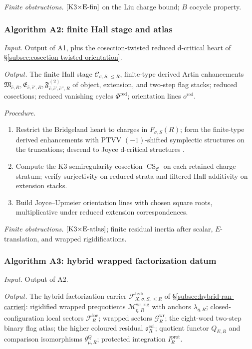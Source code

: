 \textit{Finite obstructions.}
$[\textup{K3$\times$E-fin}]$ on the Liu charge bound; $B$
cocycle property.

\subsubsection*{Algorithm A2: finite Hall stage and atlas}

\textit{Input.} Output of A1, plus the cosection-twisted reduced
d-critical heart of \S\ref{subsec:cosection-twisted-orientation}.

\textit{Output.} The finite Hall stage
$\mathcal C_{\sigma,S,\le R}$, finite-type derived Artin enhancements
$\mathfrak M_{\widehat c,R},
\mathfrak E_{\widehat c,\widehat c',R},
\mathfrak F^{(2)}_{\widehat c,\widehat c',\widehat c'',R}$ of object,
extension, and two-step flag stacks; reduced cosections; reduced
vanishing cycles $\Phi^{\mathrm{red}}$; orientation lines
$o^{\mathrm{red}}$.

\textit{Procedure.}
\begin{enumerate}
\item Restrict the Bridgeland heart to charges in $F_{\sigma,S}(R)$;
form the finite-type derived enhancements with PTVV $(-1)$-shifted
symplectic structures \cite{PTVV2013} on the truncations; descend to
Joyce d-critical structures \cite{BBDJS2015}.
\item Compute the K3 semiregularity cosection
$\operatorname{CS}_{\mathcal C}$ on each retained charge stratum;
verify surjectivity on reduced strata and filtered Hall additivity
on extension stacks.
\item Build Joyce--Upmeier orientation lines \cite{JoyceUpmeier} with
chosen square roots, multiplicative under reduced extension
correspondences.
\end{enumerate}

\textit{Finite obstructions.}
$[\textup{K3$\times$E-atlas}]$; finite residual inertia after
scalar, $E$-translation, and wrapped rigidifications.

\subsubsection*{Algorithm A3: hybrid wrapped factorization datum}

\textit{Input.} Output of A2.

\textit{Output.} The hybrid factorization carrier
$\mathcal F_{X,\sigma,S,\le R}^{\mathrm{hyb}}$ of
\S\ref{subsec:hybrid-ran-carrier}: rigidified wrapped prequotients
$\mathcal M_{\eta,R}^{\mathrm{wr,rig}}$ with anchors
$\lambda_{\eta,R}$; closed-configuration local sectors
$\mathcal F_R^{\mathrm{loc}}$; wrapped sectors
$\mathcal G_R^{\mathrm{wr}}$; the eight-word two-step binary flag
atlas; the higher coloured residual
$\mathfrak o^{\mathrm{col}}_R$; quotient functor $Q_{E,R}$ and
comparison isomorphisms $\theta^Q_{\mu,R}$; protected integration
$I_R^{\mathrm{prot}}$.

